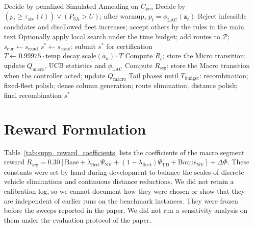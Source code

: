 \documentclass{article}
\begin{document}
\begin{algorithm}[!htbp]
\begin{algorithmic}[1]
        \EndIf
            \State Decide by penalized Simulated Annealing on $C_{\text{pen}}$
            \State Decide by $(p_t \ge \tau_{\text{acc}}(t)) \lor (P_{\text{SA}} > U)$; after warmup, $p_t = \phi_{\text{LAC}}(\mathbf{z}_t)$
        \Else
            \State Reject infeasible candidates and disallowed fleet increases; accept others by the rules in the main text
        \EndIf
            \State Optionally apply local search under the time budget; add routes to $\mathcal{P}$; $s_{\text{cur}} \leftarrow s_{\text{cand}}$
                \State $s^* \leftarrow s_{\text{cand}}$; submit $s^*$ for certification
            \EndIf
        \EndIf
        \State $T \leftarrow 0.99975 \cdot \text{temp\_decay\_scale}(a_k) \cdot T$
        \State Compute $R_t$; store the Micro transition; update $Q_{\text{micro}}$, UCB statistics and $\phi_{\text{LAC}}$
    \EndFor
    \State Compute $R_{\text{seg}}$; store the Macro transition when the controller acted; update $Q_{\text{macro}}$
\EndWhile
\State Tail phases until $T_{\text{budget}}$: recombination; fixed-fleet polish; dense column generation; route elimination; distance polish; final recombination
\State \Return $s^*$
\end{algorithmic}
\end{algorithm}

\section{Reward Formulation}
\label{sec:supp_reward_parameters}

Table~\ref{tab:supp_reward_coefficients} lists the coefficients of the macro segment reward $R_{\text{seg}} = 0.30[\text{Base} + \lambda_{\text{fleet}} \Psi_{\mathrm{NV}} + (1 - \lambda_{\text{fleet}}) \Psi_{\mathrm{TD}} + \text{Bonus}_{\mathrm{NV}}] + \Delta \Phi$. These constants were set by hand during development to balance the scales of discrete vehicle eliminations and continuous distance reductions. We did not retain a calibration log, so we cannot document how they were chosen or show that they are independent of earlier runs on the benchmark instances. They were frozen before the sweeps reported in the paper. We did not run a sensitivity analysis on them under the evaluation protocol of the paper.
\end{document}
